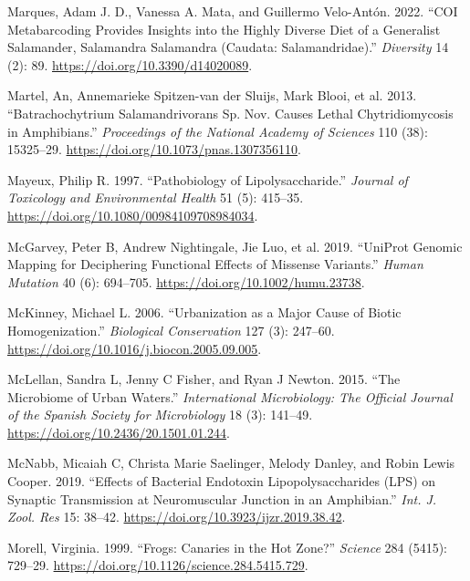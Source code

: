 \documentclass[
  12pt,
]{article}
\newlength{\cslhangindent}
\newenvironment{CSLReferences}[2] %
 {\begin{list}{}{%
  \setlength{\itemindent}{0pt}
  \setlength{\leftmargin}{0pt}
  \setlength{\parsep}{0pt}
  \ifodd #1
   \setlength{\leftmargin}{\cslhangindent}
   \setlength{\itemindent}{-1\cslhangindent}
  \fi
  \setlength{\itemsep}{#2\baselineskip}}}
 {\end{list}}
\begin{document}
\begin{CSLReferences}{1}{1}
Marques, Adam J. D., Vanessa A. Mata, and Guillermo Velo-Antón. 2022.
{``{COI} {Metabarcoding} {Provides} {Insights} into the {Highly}
{Diverse} {Diet} of a {Generalist} {Salamander}, {Salamandra} Salamandra
({Caudata}: {Salamandridae}).''} \emph{Diversity} 14 (2): 89.
\url{https://doi.org/10.3390/d14020089}.

{Martel, An, Annemarieke Spitzen-van der Sluijs, Mark Blooi, et al.}
2013. {``Batrachochytrium Salamandrivorans Sp. Nov. Causes Lethal
Chytridiomycosis in Amphibians.''} \emph{Proceedings of the National
Academy of Sciences} 110 (38): 15325--29.
\url{https://doi.org/10.1073/pnas.1307356110}.

Mayeux, Philip R. 1997. {``Pathobiology of {Lipolysaccharide}.''}
\emph{Journal of Toxicology and Environmental Health} 51 (5): 415--35.
\url{https://doi.org/10.1080/00984109708984034}.

McGarvey, Peter B, Andrew Nightingale, Jie Luo, et al. 2019.
{``{UniProt} Genomic Mapping for Deciphering Functional Effects of
Missense Variants.''} \emph{Human Mutation} 40 (6): 694--705.
\url{https://doi.org/10.1002/humu.23738}.

McKinney, Michael L. 2006. {``Urbanization as a Major Cause of Biotic
Homogenization.''} \emph{Biological Conservation} 127 (3): 247--60.
\url{https://doi.org/10.1016/j.biocon.2005.09.005}.

McLellan, Sandra L, Jenny C Fisher, and Ryan J Newton. 2015. {``The
Microbiome of Urban Waters.''} \emph{International Microbiology: The
Official Journal of the Spanish Society for Microbiology} 18 (3):
141--49. \url{https://doi.org/10.2436/20.1501.01.244}.

McNabb, Micaiah C, Christa Marie Saelinger, Melody Danley, and Robin
Lewis Cooper. 2019. {``Effects of {Bacterial} {Endotoxin}
{Lipopolysaccharides} ({LPS}) on {Synaptic} {Transmission} at
{Neuromuscular} {Junction} in an {Amphibian}.''} \emph{Int. J. Zool.
Res} 15: 38--42. \url{https://doi.org/10.3923/ijzr.2019.38.42}.

Morell, Virginia. 1999. {``Frogs: {Canaries} in the {Hot} {Zone}?''}
\emph{Science} 284 (5415): 729--29.
\url{https://doi.org/10.1126/science.284.5415.729}.


\end{CSLReferences}
\end{document}
